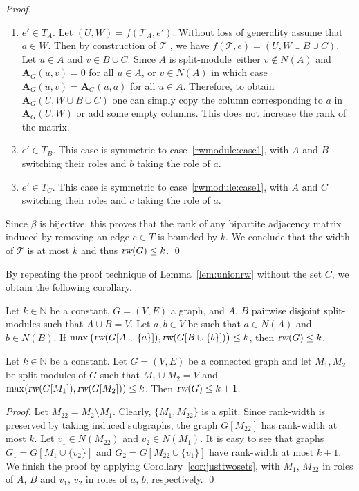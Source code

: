 \documentclass{llncs}
\newcommand{\Nat}{\mathbb{N}}
\def\sm{split-module}
\newcommand{\rw}{\text{\normalfont\slshape rw}}
\begin{document}
{\begin{proof}
  \begin{enumerate}
  \item $e' \in T_{A}$. Let $(U, W) = f(\mathcal{T}_{A},
    e')$. Without loss of generality assume that $a \in
    W$.  Then by construction of $\mathcal{T}$ , we have $f(\mathcal{T},
    e) = (U, W \cup B\cup C)$. Let $u\in A$ and $v\in B\cup C$. Since $A$ is \sm~either $v\notin N(A)$ and $\mathbf{A}_G(u, v) =0$ for all $u\in A$, or $v\in N(A)$ in which case $\mathbf{A}_G(u, v) =
    \mathbf{A}_G(u, a)$ for all $u\in A$. Therefore, to obtain $\mathbf{A}_G(U, W\cup B\cup C) $ one can simply copy the column corresponding to $a$ in $\mathbf{A}_G(U, W)$ or add some empty columns. This does not increase the rank of the matrix. \label{rwmodule:case1}
  \item $e' \in T_{B}$. This case is symmetric to case~\ref{rwmodule:case1}, with
    $A$ and $B$ switching their roles and  $b$ taking the role of $a$.
  \item $e' \in T_{C}$. This case is symmetric to case~\ref{rwmodule:case1}, with
    $A$ and $C$ switching their roles and  $c$ taking the role of $a$.
  \end{enumerate}
  Since $\beta$ is bijective, this proves that the rank of any bipartite
  adjacency matrix induced by removing an edge $e \in T$ is bounded by $k$. We
  conclude that the width of $\mathcal{T}$ is at most $k$ and thus
  \mbox{$\rw(G) \leq k$}.
  \qed
\end{proof}

By repeating the proof technique of Lemma~\ref{lem:unionrw} without the set $C$, we obtain the following corollary.
\begin{corollary}
\label{cor:justtwosets}
Let $k\in \Nat$ be a constant, $G=(V,E)$ a graph, and  $A$, $B$ pairwise disjoint \sm s such that $A\cup B=V$. Let $a,b\in V$ be such that $a\in N(A)$ and $b\in N(B)$. 
If $\max \big(\rw(G[A\cup \{a\}]),\rw(G[B\cup \{b\}])\big)\le k$, then $\rw(G)\le k$.
\end{corollary}

\begin{lemma}\label{lem:smallrw}
 Let $k \in \Nat$ be a constant. Let $G=(V,E)$ be a connected graph and let $M_1, M_2$
  be \sm s of $G$ such that $M_1 \cup M_2 = V$ and $\max(\rw(G[M_1]),
  \rw(G[M_2])) \leq k$. Then $\rw(G) \leq k+1$.
\end{lemma}

\begin{proof}
Let $M_{22} = M_2\setminus M_1$. Clearly, $\{M_1, M_{22}\}$ is a split. Since rank-width is preserved by taking induced subgraphs, the graph $G[M_{22}]$ has rank-width at most $k$. Let $v_1\in N(M_{22})$ and $v_2\in N(M_1)$. It is easy to see that 
graphs  $G_{1} =
  G[M_{1} \cup \{v_{2}\}]$ and $G_{2} = G[M_{22} \cup \{v_{1}\}]$ have rank-width at most
 $k+1$. We finish the proof by applying Corollary~\ref{cor:justtwosets}, with $M_1$, $M_{22}$
 in roles of $A$, $B$ and $v_1$, $v_2$ in roles of $a$, $b$, respectively.
 \qed
\end{proof}}
\lv{\lemunion}
\end{document}
